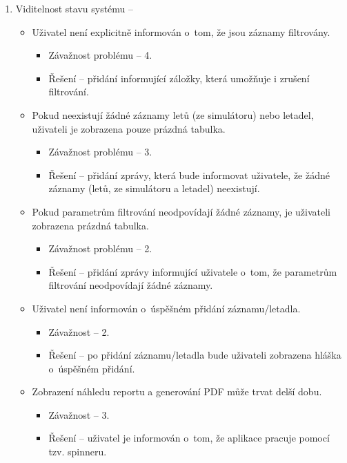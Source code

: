 \documentclass[thesis=M,czech]{FITthesis}[2012/06/26]
\begin{document}
\begin{enumerate}

\item Viditelnost stavu systému -- 
\begin{itemize}
	\item Uživatel není explicitně informován o~tom, že jsou záznamy filtrovány.
 	\begin{itemize}
 		\item Závažnost problému -- 4.
 		\item Řešení -- přidání informující záložky, která umožňuje i zrušení filtrování.
 	\end{itemize}
 	\item Pokud neexistují žádné záznamy letů (ze simulátoru) nebo letadel, uživateli je zobrazena pouze prázdná tabulka.
 	\begin{itemize}
 		\item Závažnost problému -- 3.
 		\item Řešení -- přidání zprávy, která bude informovat uživatele, že žádné záznamy (letů, ze simulátoru a letadel) neexistují.
 	\end{itemize}
 	\item Pokud parametrům filtrování neodpovídají žádné záznamy, je uživateli zobrazena prázdná tabulka.
 	\begin{itemize}
 		\item Závažnost problému -- 2.
 		\item Řešení -- přidání zprávy informující uživatele o~tom, že parametrům filtrování neodpovídají žádné záznamy. 	
 	\end{itemize}
 	\item Uživatel není informován o~úspěšném přidání záznamu/letadla.
 	\begin{itemize}
 		\item Závažnost -- 2.
 		\item Řešení -- po přidání záznamu/letadla bude uživateli zobrazena hláška o~úspěšném přidání.
 	\end{itemize}
 	\item Zobrazení náhledu reportu a generování PDF může trvat delší dobu.
 	\begin{itemize}
 		\item Závažnost -- 3.
 		\item Řešení -- uživatel je informován o~tom, že aplikace pracuje pomocí tzv. spinneru. 
 	\end{itemize}
\end{itemize}
 

\end{enumerate}
\end{document}
